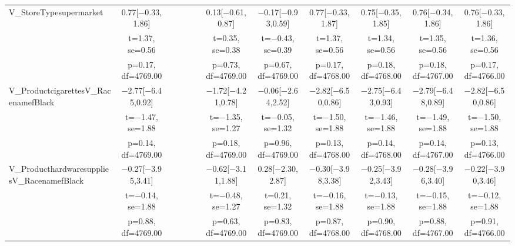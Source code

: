\documentclass[]{report}
\begin{document}
\begin{table}
{\begin{tabular}[t]{lccccccccccc}
		V\_StoreTypesupermarket & \num{0.77}[\num{-0.33},\num{1.86}] &  &  &  &  & \num{0.13}[\num{-0.61},\num{0.87}] & \num{-0.17}[\num{-0.93},\num{0.59}] & \num{0.77}[\num{-0.33},\num{1.87}] & \num{0.75}[\num{-0.35},\num{1.85}] & \num{0.76}[\num{-0.34},\num{1.86}] & \num{0.76}[\num{-0.33},\num{1.86}]\\
		& t=\num{1.37}, se=\num{0.56} &  &  &  &  & t=\num{0.35}, se=\num{0.38} & t=\num{-0.43}, se=\num{0.39} & t=\num{1.37}, se=\num{0.56} & t=\num{1.34}, se=\num{0.56} & t=\num{1.35}, se=\num{0.56} & t=\num{1.36}, se=\num{0.56}\\
		& p=\num{0.17}, df=\num{4769.00} &  &  &  &  & p=\num{0.73}, df=\num{4769.00} & p=\num{0.67}, df=\num{4769.00} & p=\num{0.17}, df=\num{4768.00} & p=\num{0.18}, df=\num{4768.00} & p=\num{0.18}, df=\num{4767.00} & p=\num{0.17}, df=\num{4766.00}\\
		V\_ProductcigarettesV\_RacenamefBlack & \num{-2.77}[\num{-6.45},\num{0.92}] &  &  &  &  & \num{-1.72}[\num{-4.21},\num{0.78}] & \num{-0.06}[\num{-2.64},\num{2.52}] & \num{-2.82}[\num{-6.50},\num{0.86}] & \num{-2.75}[\num{-6.43},\num{0.93}] & \num{-2.79}[\num{-6.48},\num{0.89}] & \num{-2.82}[\num{-6.50},\num{0.86}]\\
		& t=\num{-1.47}, se=\num{1.88} &  &  &  &  & t=\num{-1.35}, se=\num{1.27} & t=\num{-0.05}, se=\num{1.32} & t=\num{-1.50}, se=\num{1.88} & t=\num{-1.46}, se=\num{1.88} & t=\num{-1.49}, se=\num{1.88} & t=\num{-1.50}, se=\num{1.88}\\
		& p=\num{0.14}, df=\num{4769.00} &  &  &  &  & p=\num{0.18}, df=\num{4769.00} & p=\num{0.96}, df=\num{4769.00} & p=\num{0.13}, df=\num{4768.00} & p=\num{0.14}, df=\num{4768.00} & p=\num{0.14}, df=\num{4767.00} & p=\num{0.13}, df=\num{4766.00}\\
		V\_ProducthardwaresuppliesV\_RacenamefBlack & \num{-0.27}[\num{-3.95},\num{3.41}] &  &  &  &  & \num{-0.62}[\num{-3.11},\num{1.88}] & \num{0.28}[\num{-2.30},\num{2.87}] & \num{-0.30}[\num{-3.98},\num{3.38}] & \num{-0.25}[\num{-3.92},\num{3.43}] & \num{-0.28}[\num{-3.96},\num{3.40}] & \num{-0.22}[\num{-3.90},\num{3.46}]\\
		& t=\num{-0.14}, se=\num{1.88} &  &  &  &  & t=\num{-0.48}, se=\num{1.27} & t=\num{0.21}, se=\num{1.32} & t=\num{-0.16}, se=\num{1.88} & t=\num{-0.13}, se=\num{1.88} & t=\num{-0.15}, se=\num{1.88} & t=\num{-0.12}, se=\num{1.88}\\
		& p=\num{0.88}, df=\num{4769.00} &  &  &  &  & p=\num{0.63}, df=\num{4769.00} & p=\num{0.83}, df=\num{4769.00} & p=\num{0.87}, df=\num{4768.00} & p=\num{0.90}, df=\num{4768.00} & p=\num{0.88}, df=\num{4767.00} & p=\num{0.91}, df=\num{4766.00}\\

\end{tabular}}
\end{table}
\end{document}
